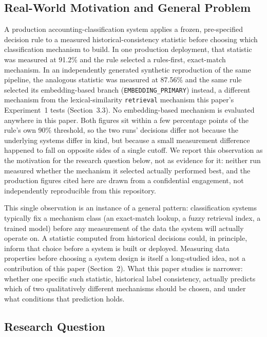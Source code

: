 \documentclass[11pt]{article}
\begin{document}
\subsection{Real-World Motivation and General Problem}
\label{sec:motivation}

A production accounting-classification system applies a frozen,
pre-specified decision rule to a measured historical-consistency statistic
before choosing which classification mechanism to build. In one production
deployment, that statistic was measured at 91.2\% and the rule selected a
rules-first, exact-match mechanism. In an independently generated synthetic
reproduction of the same pipeline, the analogous statistic was measured at
87.56\% and the same rule selected its embedding-based branch
(\texttt{EMBEDDING\_PRIMARY}) instead, a different mechanism from the
lexical-similarity \texttt{retrieval} mechanism this paper's Experiment~1
tests (Section~3.3). No embedding-based mechanism is evaluated anywhere in
this paper. Both figures sit within a few percentage points of the rule's own 90\% threshold,
so the two runs' decisions differ not because the underlying systems differ
in kind, but because a small measurement difference happened to fall on
opposite sides of a single cutoff. We report this observation as the
motivation for the research question below, not as evidence for it: neither
run measured whether the mechanism it selected actually performed best, and
the production figures cited here are drawn from a confidential engagement,
not independently reproducible from this repository.

This single observation is an instance of a general pattern: classification
systems typically fix a mechanism class (an exact-match lookup, a fuzzy
retrieval index, a trained model) before any measurement of the data the
system will actually operate on. A statistic computed from historical
decisions could, in principle, inform that choice before a system is built
or deployed. Measuring data properties before choosing a system design is
itself a long-studied idea, not a contribution of this paper (Section~2). What
this paper studies is narrower: whether one specific such statistic,
historical label consistency, actually predicts which of two qualitatively
different mechanisms should be chosen, and under what conditions that
prediction holds.

\subsection{Research Question}
\label{sec:research-question}
\end{document}
